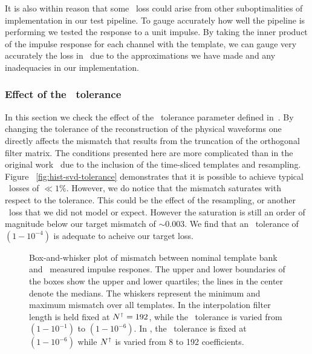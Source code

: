 It is also within reason that some \SNR\ loss could arise from other
suboptimalities of implementation in our test pipeline.  To gauge
accurately how well the pipeline is performing we tested the response to a
unit impulse.  By taking the inner product of the impulse response for each channel
with the template, we can gauge very accurately the loss in
\SNR\ due to the approximations we have made and any inadequacies in
our implementation.

\subsubsection{Effect of the \SVD\ tolerance}

In this section we check the effect of the \SVD\ tolerance parameter defined
in~\cite{Cannon:2010p10398}.  By changing the tolerance of the reconstruction
of the physical waveforms one directly affects the mismatch that results from
the truncation of the orthogonal filter matrix.  The conditions presented here
are more complicated than in the original work~\cite{Cannon:2010p10398} due to
the inclusion of the time-sliced templates and resampling.  Figure~%
\ref{fig:hist-svd-tolerance} demonstrates that it is possible to achieve
typical \SNR\ losses of $\ll1\%$.  However, we do notice that the mismatch
saturates with respect to the tolerance.  This could be the effect of the
resampling, or another \SNR\ loss that we did not model or expect.  However the
saturation is still an order of magnitude below our target mismatch of
$\sim$0.003.  We find that an \SVD\ tolerance of $\left(1-10^{-4}\right)$ is
adequate to acheive our target \SNR{} loss.
%
\begin{figure}
	\begin{center}
		\caption{Box-and-whisker plot of mismatch between nominal
template bank and \lloid\ measured impulse respones.  The upper and lower boundaries of
the boxes show the upper and lower quartiles; the lines in the center denote the medians.
The whiskers represent the minimum and maximum mismatch over all templates.  In 
 the interpolation filter length is held fixed
at $N^\shortuparrow = 192$, while the \SVD\ tolerance is varied from
$\left(1-10^{-1}\right)$ to $\left(1-10^{-6}\right)$.  In , the \SVD\ tolerance is fixed at $\left(1-10^{-6}\right)$ while $N^\shortuparrow$ is varied from 8 to 192 coefficients.}
	\end{center}
\end{figure}

